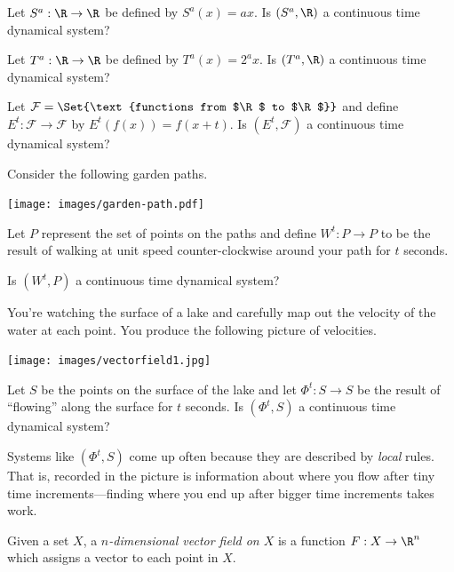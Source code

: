 	\question
	\begin{parts}
		\item Let $S^a:\R\to\R$ be defined by $S^a(x)=ax$. Is $(S^a,\R)$ a continuous time dynamical system?
		\item Let $T^a:\R\to\R$ be defined by $T^a(x)=2^a x$. Is $(T^a,\R)$ a continuous time dynamical system?
		\item Let $\mathcal F=\Set{\text{functions from $\R$ to $\R$}}$ and define $E^t:\mathcal F\to\mathcal F$
			by $E^t(f(x)) = f(x+t)$. Is $(E^t,\mathcal F)$ a continuous time dynamical system?
	\end{parts}

	\newpage
	\question
	\begin{parts}
		\item 

		Consider the following garden paths.
		\begin{center}
			\texttt{[image: images/garden-path.pdf]}
		\end{center}
		Let $P$ represent the set of points on the paths and define $W^t:P\to P$ to be the result of walking
		at unit speed counter-clockwise around your path for $t$ seconds.

			Is $(W^t,P)$ a continuous time dynamical system?

		\item You're watching the surface of a lake and carefully map out the velocity of the
			water at each point. You produce the following picture of velocities.
		\begin{center}
			\texttt{[image: images/vectorfield1.jpg]}
		\end{center}
			Let $S$ be the points on the surface of the lake and let $\Phi^t:S\to S$ be the result
			of ``flowing'' along the surface for $t$ seconds. Is $(\Phi^t, S)$ a continuous time dynamical system?
	\end{parts}

	Systems like $(\Phi^t,S)$ come up often because they are described by \emph{local} rules. That is, recorded in the
	picture is information about where you flow after tiny time increments---finding where you end up after bigger time
	increments takes work.

	\newpage
	\begin{definition}
		Given a set $X$, a \emph{$n$-dimensional vector field on $X$} is a function $F:X\to \R^n$ which
		assigns a vector to each point in $X$.
	\end{definition}

